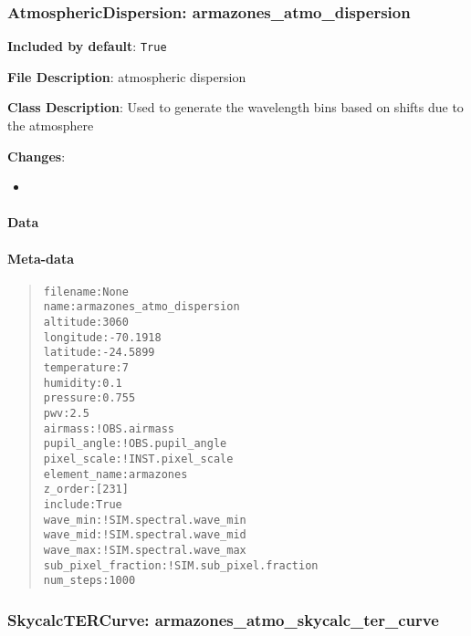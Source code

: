 \documentclass[a4paper]{article}
\begin{document}
\subsubsection{AtmosphericDispersion: \textquotedbl{}armazones\_atmo\_dispersion\textquotedbl{}%
  \label{atmosphericdispersion-armazones-atmo-dispersion}%
}

\textbf{Included by default}: \texttt{True}

\textbf{File Description}: atmospheric dispersion

\textbf{Class Description}: Used to generate the wavelength bins based on shifts due to the atmosphere

\textbf{Changes}:

\begin{itemize}
\item \end{itemize}


\paragraph{Data%
  \label{id1}%
}


\paragraph{Meta-data%
  \label{id2}%
}

\begin{quote}
\begin{alltt}
          filename : None
              name : armazones_atmo_dispersion
          altitude : 3060
         longitude : -70.1918
          latitude : -24.5899
       temperature : 7
          humidity : 0.1
          pressure : 0.755
               pwv : 2.5
           airmass : !OBS.airmass
       pupil_angle : !OBS.pupil_angle
       pixel_scale : !INST.pixel_scale
      element_name : armazones
           z_order : [231]
           include : True
          wave_min : !SIM.spectral.wave_min
          wave_mid : !SIM.spectral.wave_mid
          wave_max : !SIM.spectral.wave_max
sub_pixel_fraction : !SIM.sub_pixel.fraction
         num_steps : 1000
\end{alltt}
\end{quote}


\subsubsection{SkycalcTERCurve: \textquotedbl{}armazones\_atmo\_skycalc\_ter\_curve\textquotedbl{}%
  \label{skycalctercurve-armazones-atmo-skycalc-ter-curve}%
}
\end{document}
